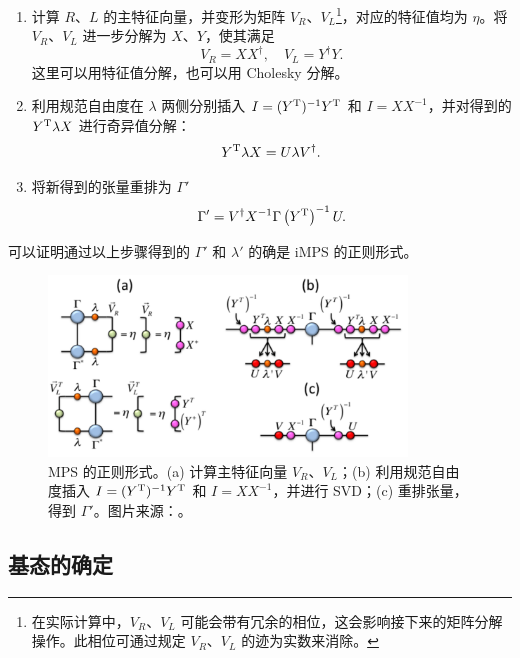 \begin{enumerate}
  \item 计算 $R$、$L$ 的主特征向量，并变形为矩阵 $V_R$、$V_L$\footnote{在实际计算中，$V_R$、$V_L$ 可能会带有冗余的相位，这会影响接下来的矩阵分解操作。此相位可通过规定 $V_R$、$V_L$ 的迹为实数来消除。}，对应的特征值均为 $\eta$。将 $V_R$、$V_L$ 进一步分解为 $X$、$Y$，使其满足
    \begin{equation}
      V_R = X X^\dagger, \quad V_L = Y^\dagger Y.
    \end{equation}
    这里可以用特征值分解，也可以用 Cholesky 分解。

  \item 利用规范自由度在 $\lambda$ 两侧分别插入 $I=(Y^{\mathrm{T}})^{-1}Y^{\mathrm{T}}$ 和 $I=XX^{-1}$，并对得到的 $Y^{\mathrm{T}}\lambda X$ 进行奇异值分解：
    \begin{equation}
      Y^{\mathrm{T}} \lambda X = U \lambda V^\dagger.
    \end{equation}

  \item 将新得到的张量重排为 $\Gamma'$
    \begin{equation}
      \Gamma' = V^\dagger X^{-1} \Gamma \left( Y^{\mathrm{T}} \right)^{-1} U.
    \end{equation}
\end{enumerate}

可以证明通过以上步骤得到的 $\Gamma'$ 和 $\lambda'$ 的确是 iMPS 的正则形式。

\begin{figure}[htb]
  \centering
  \includegraphics[width=0.85\textwidth]{images/tensor-network/mps-canonical-form.pdf}
  \caption[MPS 的正则形式]{MPS 的正则形式。(a) 计算主特征向量 $V_R$、$V_L$；(b) 利用规范自由度插入 $I=(Y^{\mathrm{T}})^{-1}Y^{\mathrm{T}}$ 和 $I=XX^{-1}$，并进行 SVD；(c) 重排张量，得到 $\Gamma'$。图片来源：\parencite{orus2014practical}。}
  \label{fig:mps-canonical-form}
\end{figure}

\subsection{基态的确定}

